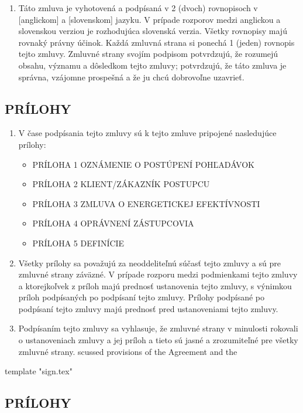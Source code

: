 \documentclass[a4paper]{article}
\begin{document}
\begin{multicols}{2}
\begin{enumerate}
    \item Táto zmluva je vyhotovená a podpísaná v 2 (dvoch) rovnopisoch v [anglickom] a [slovenskom] jazyku. V prípade rozporov medzi anglickou a slovenskou verziou je rozhodujúca slovenská verzia. Všetky rovnopisy majú rovnaký právny účinok. Každá zmluvná strana si ponechá 1 (jeden) rovnopis tejto zmluvy. Zmluvné strany svojím podpisom potvrdzujú, že rozumejú obsahu, významu a dôsledkom tejto zmluvy; potvrdzujú, že táto zmluva je správna, vzájomne prospešná a že ju chcú dobrovoľne uzavrieť. 
\end{enumerate}
\subsection{PRÍLOHY}

\begin{enumerate}
\item V čase podpísania tejto zmluvy sú k tejto zmluve pripojené nasledujúce prílohy: 
\begin{itemize}
    \item PRÍLOHA 1 OZNÁMENIE O POSTÚPENÍ POHĽADÁVOK
    \item PRÍLOHA 2 KLIENT/ZÁKAZNÍK POSTUPCU
    \item PRÍLOHA 3 ZMLUVA O ENERGETICKEJ EFEKTÍVNOSTI
    \item PRÍLOHA 4 OPRÁVNENÍ ZÁSTUPCOVIA
    \item PRÍLOHA 5 DEFINÍCIE
\end{itemize}
\item Všetky prílohy sa považujú za neoddeliteľnú súčasť tejto zmluvy a sú pre zmluvné strany záväzné. V prípade rozporu medzi podmienkami tejto zmluvy a ktorejkoľvek z príloh majú prednosť ustanovenia tejto zmluvy, s výnimkou príloh podpísaných po podpísaní tejto zmluvy. Prílohy podpísané po podpísaní tejto zmluvy majú prednosť pred ustanoveniami tejto zmluvy.
\item Podpísaním tejto zmluvy sa vyhlasuje, že zmluvné strany v minulosti rokovali o ustanoveniach zmluvy a jej príloh a tieto sú jasné a zrozumiteľné pre všetky zmluvné strany.
scussed provisions of the Agreement and the
  \end{enumerate}

\end{multicols}

\vspace{5mm}

{{template "sign.tex"}}

\begin{center}
  \section{PRÍLOHY}
\end{center}
\end{document}
